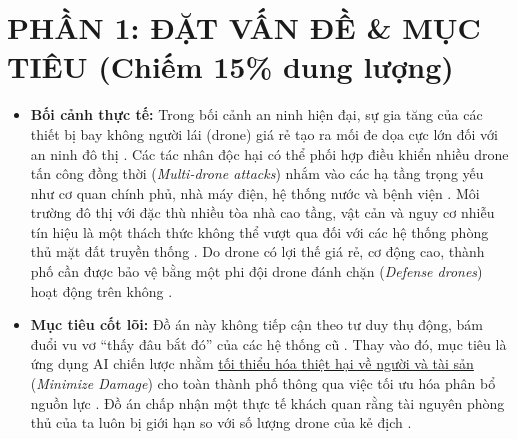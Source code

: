 \documentclass[../main.tex]{subfiles}
\begin{document}

\section{PHẦN 1: ĐẶT VẤN ĐỀ \& MỤC TIÊU (Chiếm 15\% dung lượng)}

\begin{itemize}
    \item \textbf{Bối cảnh thực tế:} Trong bối cảnh an ninh hiện đại, sự gia tăng của các thiết bị bay không người lái (drone) giá rẻ tạo ra mối đe dọa cực lớn đối với an ninh đô thị \cite{mutzari2025defending}. Các tác nhân độc hại có thể phối hợp điều khiển nhiều drone tấn công đồng thời (\textit{Multi-drone attacks}) nhắm vào các hạ tầng trọng yếu như cơ quan chính phủ, nhà máy điện, hệ thống nước và bệnh viện \cite{mutzari2025defending}. Môi trường đô thị với đặc thù nhiều tòa nhà cao tầng, vật cản và nguy cơ nhiễu tín hiệu là một thách thức không thể vượt qua đối với các hệ thống phòng thủ mặt đất truyền thống \cite{mutzari2025defending}. Do drone có lợi thế giá rẻ, cơ động cao, thành phố cần được bảo vệ bằng một phi đội drone đánh chặn (\textit{Defense drones}) hoạt động trên không \cite{mutzari2025defending}.
    \item \textbf{Mục tiêu cốt lõi:} Đồ án này không tiếp cận theo tư duy thụ động, bám đuổi vu vơ ``thấy đâu bắt đó'' của các hệ thống cũ \cite{mutzari2025defending}. Thay vào đó, mục tiêu là ứng dụng AI chiến lược nhằm \underline{tối thiểu hóa thiệt hại về người và tài sản} (\textit{Minimize Damage}) cho toàn thành phố thông qua việc tối ưu hóa phân bổ nguồn lực \cite{mutzari2025defending}. Đồ án chấp nhận một thực tế khách quan rằng tài nguyên phòng thủ của ta luôn bị giới hạn so với số lượng drone của kẻ địch \cite{mutzari2025defending}.
\end{itemize}
\end{document}
